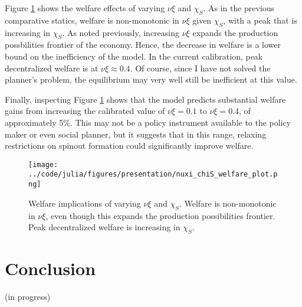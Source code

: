 \documentclass[12pt,english]{article}
\theoremstyle{remark}
\begin{document}
Figure \ref{nuxi_chiS_welfare} shows the welfare effects of varying $\nu \xi$ and $\chi_S$. As in the previous comparative statics, welfare is non-monotonic in $\nu \xi$ given $\chi_S$, with a peak that is increasing in $\chi_S$. As noted previously, increasing $\nu \xi$ expands the production possbilities frontier of the economy. Hence, the decrease in welfare is a lower bound on the inefficiency of the model. In the current calibration, peak decentralized welfare is at $\nu \xi \approx 0.4$. Of course, since I have not solved the planner's problem, the equilibrium may very well still be inefficient at this value. 

Finally, inspecting Figure \ref{nuxi_chiS_welfare} shows that the model predicts substantial welfare gains from increasing the calibrated value of $\nu \xi = 0.1$ to $\nu \xi = 0.4$, of approximately 5\%. This may not be a policy instrument available to the policy maker or even social planner, but it suggests that in this range, relaxing restrictions on spinout formation could significantly improve welfare. 

\begin{figure}[h] 
	\centering
	\texttt{[image: ../code/julia/figures/presentation/nuxi\_chiS\_welfare\_plot.png]}
	\caption{Welfare implications of varying $\nu \xi$ and $\chi_S$. Welfare is non-monotonic in $\nu \xi$, even though this expands the production possibilities frontier. Peak decentralized welfare is increasing in $\chi_S$.}
	\label{nuxi_chiS_welfare}
\end{figure}


\section{Conclusion}\label{conclusion}

(in progress)


\end{document}
